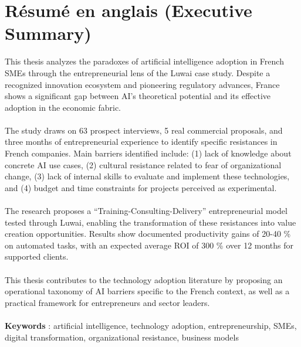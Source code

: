 \newpage
\section*{Résumé en anglais (Executive Summary)}

This thesis analyzes the paradoxes of artificial intelligence adoption in French SMEs through the entrepreneurial lens of the Luwai case study. Despite a recognized innovation ecosystem and pioneering regulatory advances, France shows a significant gap between AI’s theoretical potential and its effective adoption in the economic fabric.
\\\\
The study draws on 63 prospect interviews, 5 real commercial proposals, and three months of entrepreneurial experience to identify specific resistances in French companies. Main barriers identified include:
(1) lack of knowledge about concrete AI use cases,
(2) cultural resistance related to fear of organizational change,
(3) lack of internal skills to evaluate and implement these technologies, and
(4) budget and time constraints for projects perceived as experimental.
\\\\
The research proposes a “Training-Consulting-Delivery” entrepreneurial model tested through Luwai, enabling the transformation of these resistances into value creation opportunities. Results show documented productivity gains of 20-40 \% on automated tasks, with an expected average ROI of 300 \% over 12 months for supported clients.
\\\\
This thesis contributes to the technology adoption literature by proposing an operational taxonomy of AI barriers specific to the French context, as well as a practical framework for entrepreneurs and sector leaders.
\\\\
\textbf{Keywords} : artificial intelligence, technology adoption, entrepreneurship, SMEs, digital transformation, organizational resistance, business models
